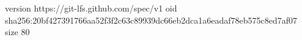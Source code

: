 version https://git-lfs.github.com/spec/v1
oid sha256:20bf427391766aa52f3f2c63c89939dc66eb2dca1a6eadaf78eb575c8ed7af07
size 80
